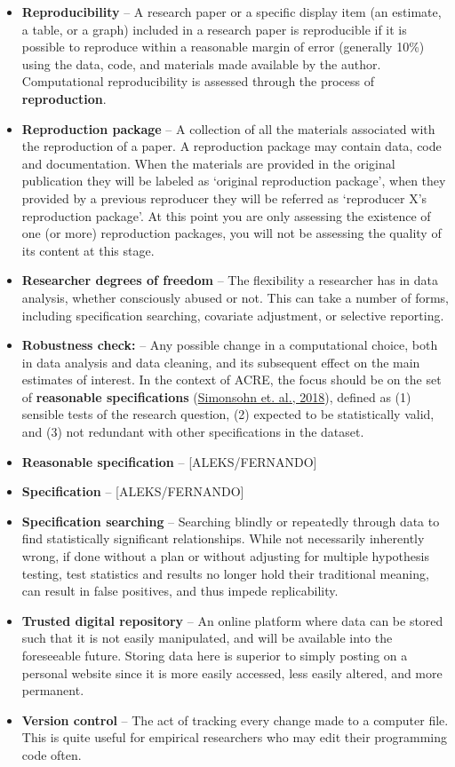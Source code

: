 \documentclass[]{book}
\begin{document}
\begin{itemize}
\item
  \textbf{Reproducibility} -- A research paper or a specific display item (an estimate, a table, or a graph) included in a research paper is reproducible if it is possible to reproduce within a reasonable margin of error (generally 10\%) using the data, code, and materials made available by the author. Computational reproducibility is assessed through the process of \textbf{reproduction}.
\item
  \textbf{Reproduction package} -- A collection of all the materials associated with the reproduction of a paper. A reproduction package may contain data, code and documentation. When the materials are provided in the original publication they will be labeled as `original reproduction package', when they provided by a previous reproducer they will be referred as `reproducer X's reproduction package'. At this point you are only assessing the existence of one (or more) reproduction packages, you will not be assessing the quality of its content at this stage.
\item
  \textbf{Researcher degrees of freedom} -- The flexibility a researcher has in data analysis, whether consciously abused or not. This can take a number of forms, including specification searching, covariate adjustment, or selective reporting.
\item
  \textbf{Robustness check:} -- Any possible change in a computational choice, both in data analysis and data cleaning, and its subsequent effect on the main estimates of interest. In the context of ACRE, the focus should be on the set of \textbf{reasonable specifications} (\href{https://urisohn.com/sohn_files/wp/wordpress/wp-content/uploads/Paper-Specification-curve-2018-11-02.pdf}{Simonsohn et. al., 2018}), defined as (1) sensible tests of the research question, (2) expected to be statistically valid, and (3) not redundant with other specifications in the dataset.
\item
  \textbf{Reasonable specification} -- {[}ALEKS/FERNANDO{]}
\item
  \textbf{Specification} -- {[}ALEKS/FERNANDO{]}
\item
  \textbf{Specification searching} -- Searching blindly or repeatedly through data to find statistically significant relationships. While not necessarily inherently wrong, if done without a plan or without adjusting for multiple hypothesis testing, test statistics and results no longer hold their traditional meaning, can result in false positives, and thus impede replicability.\\
\item
  \textbf{Trusted digital repository} -- An online platform where data can be stored such that it is not easily manipulated, and will be available into the foreseeable future. Storing data here is superior to simply posting on a personal website since it is more easily accessed, less easily altered, and more permanent.\\
\item
  \textbf{Version control} -- The act of tracking every change made to a computer file. This is quite useful for empirical researchers who may edit their programming code often.
\end{itemize}
\end{document}
